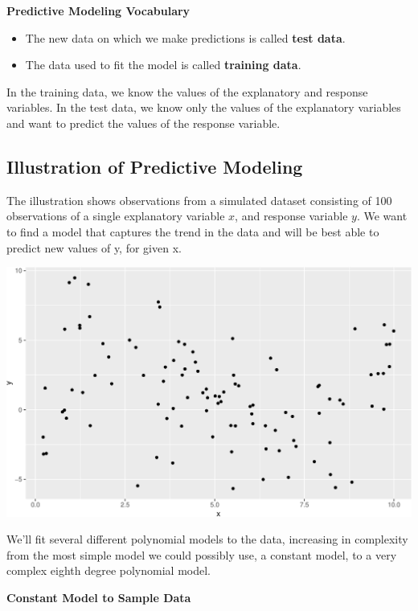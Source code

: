 \documentclass[
  letterpaper,
  DIV=11,
  numbers=noendperiod]{scrreprt}
\begin{document}
\textbf{Predictive Modeling Vocabulary}

\begin{itemize}
\item
  The new data on which we make predictions is called \textbf{test
  data}.
\item
  The data used to fit the model is called \textbf{training data}.
\end{itemize}

In the training data, we know the values of the explanatory and response
variables. In the test data, we know only the values of the explanatory
variables and want to predict the values of the response variable.

\subsection{Illustration of Predictive
Modeling}\label{illustration-of-predictive-modeling}

The illustration shows observations from a simulated dataset consisting
of 100 observations of a single explanatory variable \(x\), and response
variable \(y\). We want to find a model that captures the trend in the
data and will be best able to predict new values of y, for given x.

\includegraphics{Ch7_files/figure-pdf/unnamed-chunk-5-1.pdf}

We'll fit several different polynomial models to the data, increasing in
complexity from the most simple model we could possibly use, a constant
model, to a very complex eighth degree polynomial model.

\textbf{Constant Model to Sample Data}
\end{document}
